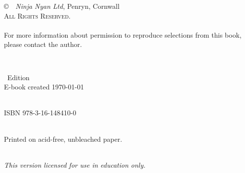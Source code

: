 


\thispagestyle{empty}
\begin{center}

\copyright~\the\year~\textit{Ninja Nyan Ltd}, Penryn, Cornwall\\
\textsc{All Rights Reserved.}\\
	~\\
For more information about permission to reproduce selections from this book, please contact the author.

\ifpdf
	~\\\par
	\the\year~Edition
\else
	~\\
	E-book created \today
\fi

\ifpdf
	~\\
	\textsc{ISBN 978-3-16-148410-0}
\fi




\ifxetex
	~\\
	Printed on acid\hyp{}free, unbleached paper.
\fi


	~\\	
	\textit{This version licensed for use in education only.}
	
\end{center}



